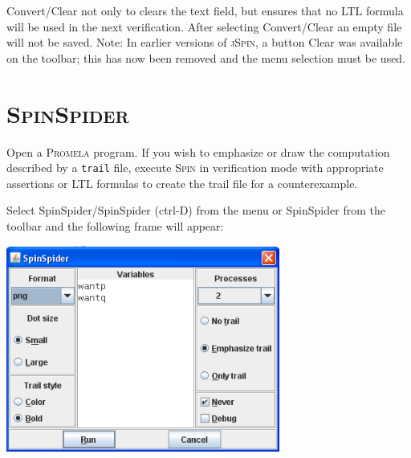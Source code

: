 \documentclass[11pt]{article}
\newcommand{\spn}{\textsc{Spin}}
\newcommand{\prm}{\textsc{Promela}}
\newcommand{\js}{\textsc{jSpin}}
\newcommand{\spd}{\textsc{SpinSpider}}
\newcommand{\p}[1]{\texttt{#1}}
\newcommand{\bu}[1]{\textsf{#1}}
\begin{document}
\bu{Convert/Clear} not only to clears the text field, but ensures that
no LTL formula will be used in the next verification. After selecting
\bu{Convert/Clear} an empty file will not be saved. Note: In earlier
versions of \js{}, a button \bu{Clear} was available on the toolbar;
this has now been removed and the menu selection must be used.

\section{\spd{}}
Open a \prm{} program. If you wish to emphasize or draw the computation
described by a \p{trail} file, execute \spn{} in verification mode with
appropriate assertions or LTL formulas to create the trail file for a counterexample.

Select \bu{SpinSpider/SpinSpider} (\bu{ctrl-D}) from the menu or \bu{SpinSpider}
from the toolbar and the following frame will appear:
\begin{center}
\includegraphics[width=9cm,keepaspectratio=true]{spd.png}
\end{center}
\end{document}
